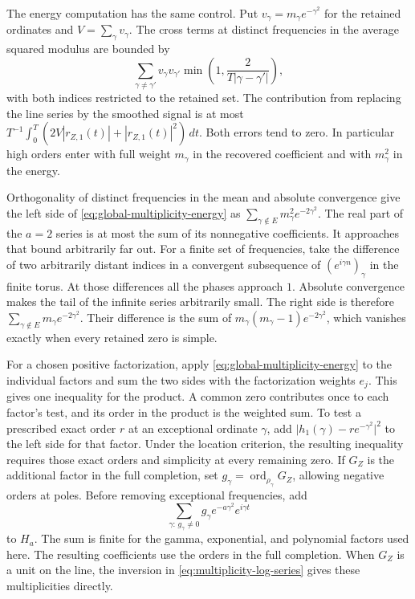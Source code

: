 \documentclass[11pt]{amsart}
\theoremstyle{definition}
\theoremstyle{remark}
\numberwithin{equation}{section}
\begin{document}
The energy computation has the same control. Put
\(v_\gamma=m_\gamma e^{-\gamma^2}\) for the retained ordinates
and \(V=\sum_\gamma v_\gamma\). The cross terms at distinct
frequencies in the average squared modulus are bounded by
\[
 \sum_{\gamma\ne\gamma'}v_\gamma v_{\gamma'}
        \min\!\left(1,\frac{2}{T|\gamma-\gamma'|}\right),
\]
with both indices restricted to the retained set. The contribution
from replacing the line series by the smoothed signal is at most
\(T^{-1}\int_0^T (2V|r_{Z,1}(t)|+|r_{Z,1}(t)|^2)\,dt\).
Both errors tend to zero. In particular high orders enter
with full weight \(m_\gamma\) in the recovered coefficient and
with \(m_\gamma^2\) in the energy.

Orthogonality of distinct frequencies in the mean and absolute
convergence give the left side of
\eqref{eq:global-multiplicity-energy} as
\(\sum_{\gamma\notin E}m_\gamma^2e^{-2\gamma^2}\).
The real part of the \(a=2\) series is at most the sum of its
nonnegative coefficients. It approaches that bound arbitrarily far
out. For a finite set of frequencies, take the difference of two
arbitrarily distant indices in a convergent subsequence of
\((e^{i\gamma n})_\gamma\) in the finite torus. At those differences all
the phases approach \(1\). Absolute convergence makes the tail of the
infinite series arbitrarily small. The right side is therefore
\(\sum_{\gamma\notin E}m_\gamma e^{-2\gamma^2}\).
Their difference is the sum of
\(m_\gamma(m_\gamma-1)e^{-2\gamma^2}\), which vanishes exactly
when every retained zero is simple.

For a chosen positive factorization, apply
\eqref{eq:global-multiplicity-energy} to the individual factors and
sum the two sides with the factorization weights \(e_j\). This gives
one inequality for the product. A common zero contributes once to
each factor's test, and its order in the product is the weighted
sum. To test a prescribed exact order \(r\) at an exceptional
ordinate \(\gamma\), add
\(\lvert h_1(\gamma)-r e^{-\gamma^2}\rvert^2\) to the left side for
that factor. Under the location criterion, the resulting inequality
requires those exact orders and simplicity at every remaining
zero. If \(G_Z\) is the additional factor in the full completion,
set \(g_\gamma=\operatorname{ord}_{\rho_\gamma}G_Z\), allowing negative
orders at poles. Before removing exceptional frequencies, add
\[
 \sum_{\gamma:\,g_\gamma\ne0}
       g_\gamma e^{-a\gamma^2}e^{i\gamma t}
\]
to \(H_a\). The sum is finite for the gamma, exponential, and
polynomial factors used here. The resulting coefficients use the
orders in the full completion. When \(G_Z\) is a unit on the line,
the inversion in \eqref{eq:multiplicity-log-series} gives these
multiplicities directly.
\end{document}
